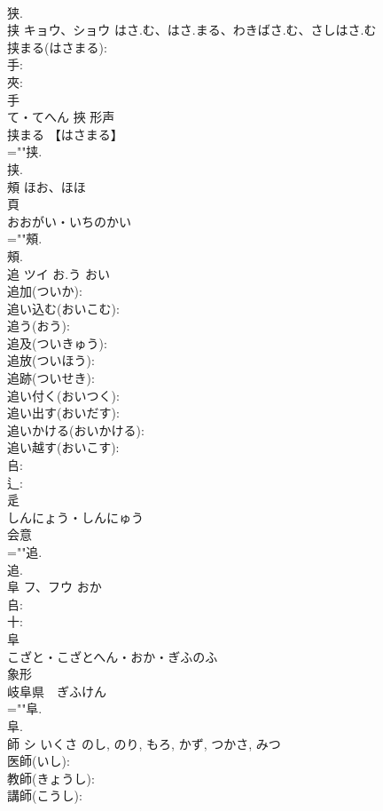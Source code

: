\documentclass[8pt]{extreport}
\begin{document}
\begin{CJK}{UTF8}{min}
\\	狭.
\\	挟	キョウ、ショウ	はさ.む、はさ.まる、わきばさ.む、さしはさ.む		
\\	挟まる(はさまる): 
\\	手: 
\\	夾: 
\\	手	
\\	て・てへん	挾	形声 
\\	挟まる 【はさまる】 
\\	=""挟.
\\	挟.
\\	頰		ほお、ほほ		
\\	頁	
\\	おおがい・いちのかい	
\\	=""頰.
\\	頰.
\\	追	ツイ	お.う	おい	
\\	追加(ついか): 
\\	追い込む(おいこむ): 
\\	追う(おう): 
\\	追及(ついきゅう): 
\\	追放(ついほう): 
\\	追跡(ついせき): 
\\	追い付く(おいつく): 
\\	追い出す(おいだす): 
\\	追いかける(おいかける): 
\\	追い越す(おいこす): 
\\	𠂤: 
\\	辶: 
\\	辵	
\\	しんにょう・しんにゅう	
\\	会意 
\\	=""追.
\\	追.
\\	阜	フ、フウ		おか	
\\	𠂤: 
\\	十: 
\\	阜	
\\	こざと・こざとへん・おか・ぎふのふ	
\\	象形 
\\	岐阜県　ぎふけん 
\\	=""阜.
\\	阜.
\\	師	シ	いくさ	のし, のり, もろ, かず, つかさ, みつ	
\\	医師(いし): 
\\	教師(きょうし): 
\\	講師(こうし): 

\end{CJK}
\end{document}
